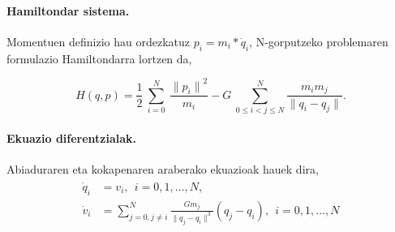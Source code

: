 \paragraph*{Hamiltondar sistema.}
Momentuen definizio hau ordezkatuz  $p_i=m_i*\dot{q}_i$, N-gorputzeko problemaren formulazio Hamiltondarra  lortzen da,  

\begin{equation}
H(q,p)=\frac{1}{2}\ \sum^N_{i=0}{\ \frac{{\|p_i\|}^2}{m_i}}-G\ \sum^N_{0\le i<j\le N}{\frac{m_im_j}{\|q_i-q_j\|}}. 
\end{equation}

\paragraph*{Ekuazio diferentzialak.} Abiaduraren eta kokapenaren araberako ekuazioak hauek dira,
\begin{align}
\label{eq:nbody}
\begin{split}
\dot{q}_i &=v_i, \ \  i=0,1,\dots, N,\\
\dot{v}_i &= \sum_{j=0,j \neq i}^{N} \frac{Gm_j}{\|q_j-q_i\|^3} (q_j-q_i) , \ \  i=0,1,\dots, N
\end{split}
\end{align}


